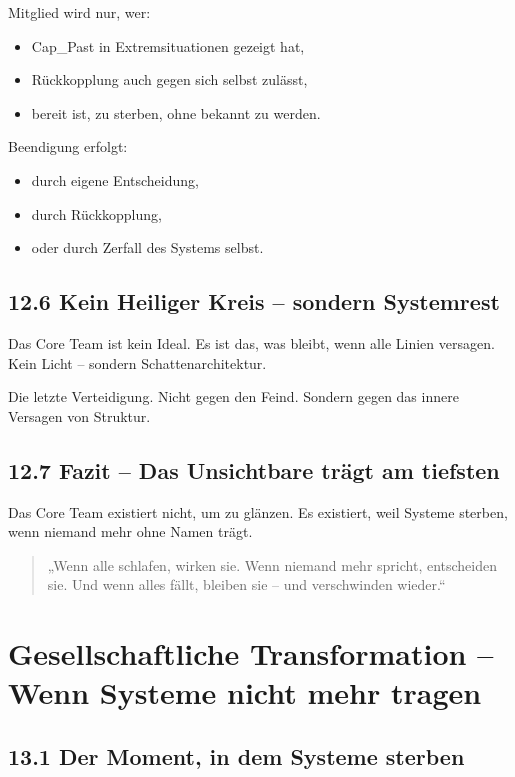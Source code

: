 \documentclass[12pt,a4paper]{book}
\begin{document}
Mitglied wird nur, wer:

\begin{itemize}
    \item Cap\_Past in Extremsituationen gezeigt hat,
    \item Rückkopplung auch gegen sich selbst zulässt,
    \item bereit ist, zu sterben, ohne bekannt zu werden.
\end{itemize}

Beendigung erfolgt:

\begin{itemize}
    \item durch eigene Entscheidung,
    \item durch Rückkopplung,
    \item oder durch Zerfall des Systems selbst.
\end{itemize}

\section*{12.6 Kein Heiliger Kreis – sondern Systemrest}

Das Core Team ist kein Ideal.  
Es ist das, was bleibt, wenn alle Linien versagen.  
Kein Licht – sondern Schattenarchitektur.

Die letzte Verteidigung.  
Nicht gegen den Feind.  
Sondern gegen das innere Versagen von Struktur.

\section*{12.7 Fazit – Das Unsichtbare trägt am tiefsten}

Das Core Team existiert nicht, um zu glänzen.  
Es existiert, weil Systeme sterben, wenn niemand mehr ohne Namen trägt.

\begin{quote}
„Wenn alle schlafen, wirken sie.  
Wenn niemand mehr spricht, entscheiden sie.  
Und wenn alles fällt, bleiben sie –  
und verschwinden wieder.“  
\end{quote}

\chapter{Gesellschaftliche Transformation – Wenn Systeme nicht mehr tragen}

\section*{13.1 Der Moment, in dem Systeme sterben}
\end{document}
